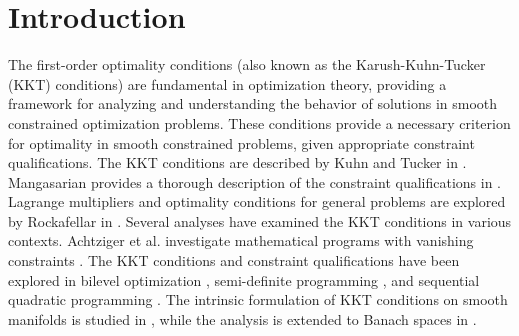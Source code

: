 \documentclass[sn-mathphys]{JORSC-jnl}%
\theoremstyle{thmstyleone}%
\theoremstyle{thmstylethree}%
\begin{document}





\maketitle

\section{Introduction}
The first-order optimality conditions (also known as the Karush-Kuhn-Tucker (KKT) conditions) are fundamental in optimization theory, providing a framework for analyzing and understanding the behavior of solutions in smooth constrained optimization problems. These conditions provide a necessary criterion for optimality in smooth constrained problems, given appropriate constraint qualifications. The KKT conditions are described by Kuhn and Tucker in \cite{KuhnTucker+1951+481+492}. Mangasarian provides a thorough description of the constraint qualifications in \cite{Mangasarian1994Nonlinear}. Lagrange multipliers and optimality conditions for general problems are explored by Rockafellar in \cite{Rockafellar1993Lagrange}. Several analyses have examined the KKT conditions in various contexts. Achtziger et al. investigate mathematical programs with vanishing constraints \cite{achtziger2008mathematical}. The KKT conditions and constraint qualifications have been explored in bilevel optimization \cite{ye2006constraint}, semi-definite programming \cite{ye2008first}, and sequential quadratic programming \cite{qi2000constant}. The intrinsic formulation of KKT conditions on smooth manifolds is studied in \cite{bergmann2019intrinsic}, while the analysis is extended to Banach spaces in \cite{borgens2020new}. 
\end{document}
